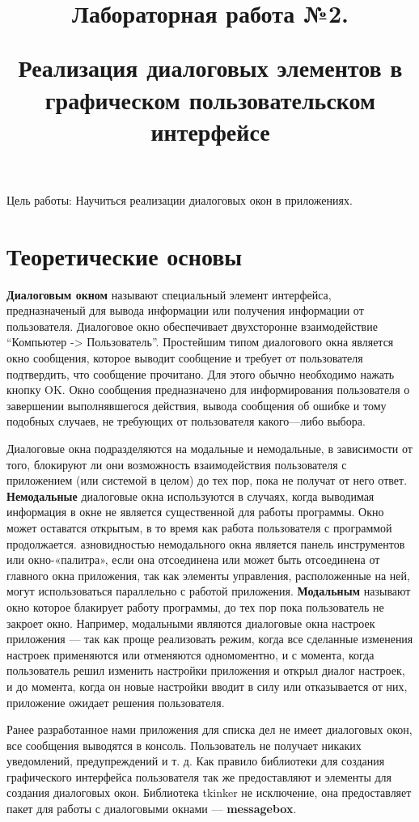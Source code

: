 \documentclass[a4paper]{article}
\title{\bfseries Лабораторная работа №2.\newline

Реализация диалоговых элементов в графическом пользовательском интерфейсе}
\date{}
\begin{document}
\maketitle
\newpage

Цель работы: Научиться реализации диалоговых окон в приложениях.

\section{Теоретические основы}

\textbf{Диалоговым окном} называют специальный элемент интерфейса, предназначеный для вывода информации или получения информации от пользователя. Диалоговое окно обеспечивает двухсторонне взаимодействие ``Компьютер -> Пользователь''. Простейшим типом диалогового окна является окно сообщения, которое выводит сообщение и требует от пользователя подтвердить, что сообщение прочитано. Для этого обычно необходимо нажать кнопку OK. Окно сообщения предназначено для информирования пользователя о завершении выполнявшегося действия, вывода сообщения об ошибке и тому подобных случаев, не требующих от пользователя какого---либо выбора.

Диалоговые окна подразделяются на модальные и немодальные, в зависимости от того, блокируют ли они возможность взаимодействия пользователя с приложением (или системой в целом) до тех пор, пока не получат от него ответ. \textbf{Немодальные} диалоговые окна используются в случаях, когда выводимая информация в окне не является существенной для работы программы. Окно может оставатся открытым, в то время как работа пользователя с программой продолжается. азновидностью немодального окна является панель инструментов или окно-«палитра», если она отсоединена или может быть отсоединена от главного окна приложения, так как элементы управления, расположенные на ней, могут использоваться параллельно с работой приложения. \textbf{Модальным} называют окно которое блакирует работу программы, до тех пор пока пользователь не закроет окно. Например, модальными являются диалоговые окна настроек приложения — так как проще реализовать режим, когда все сделанные изменения настроек применяются или отменяются одномоментно, и с момента, когда пользователь решил изменить настройки приложения и открыл диалог настроек, и до момента, когда он новые настройки вводит в силу или отказывается от них, приложение ожидает решения пользователя.

Ранее разработанное нами приложения для списка дел не имеет диалоговых окон, все сообщения выводятся в консоль. Пользователь не получает никаких уведомлений, предупреждений и т. д. Как правило библиотеки для создания графического интерфейса пользователя так же предоставляют и элементы для создания диалоговых окон. Библиотека tkinker не исключение, она предоставляет пакет для работы с диалоговыми окнами ---
\textbf{messagebox}.
\end{document}
